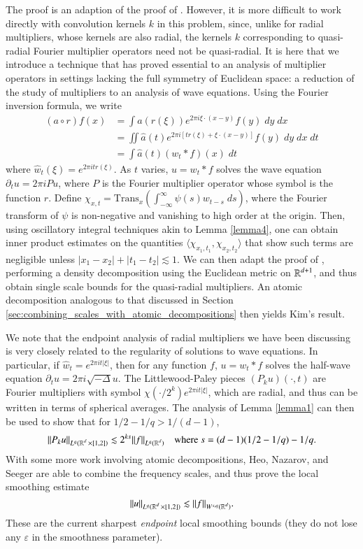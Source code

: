 The proof is an adaption of the proof of \cite{HeoandNazarovandSeeger2}. However, it is more difficult to work directly with convolution kernels $k$ in this problem, since, unlike for radial multipliers, whose kernels are also radial, the kernels $k$ corresponding to quasi-radial Fourier multiplier operators need not be quasi-radial. It is here that we introduce a technique that has proved essential to an analysis of multiplier operators in settings lacking the full symmetry of Euclidean space: a reduction of the study of multipliers to an analysis of wave equations. Using the Fourier inversion formula, we write
%
\begin{align*}
  (a \circ r) f(x) &= \int a(r(\xi)) e^{2 \pi i \xi \cdot (x - y)} f(y)\; dy\; dx\\
  &= \iint \widehat{a}(t) e^{2 \pi i [t r(\xi) + \xi \cdot (x - y)]} f(y)\; dy\; dx\; dt\\
  &= \int \widehat{a}(t) (w_t * f)(x)\; dt
\end{align*}
%
where $\widehat{w}_t(\xi) = e^{2 \pi i t r(\xi)}$. As $t$ varies, $u = w_t * f$ solves the wave equation $\partial_t u = 2 \pi i P u$, where $P$ is the Fourier multiplier operator whose symbol is the function $r$. Define $\chi_{x,t} = \text{Trans}_x \left( \int_{-\infty}^\infty \psi(s) w_{t - s}\; ds \right)$, where the Fourier transform of $\psi$ is non-negative and vanishing to high order at the origin. Then, using oscillatory integral techniques akin to Lemma \ref{lemma4}, one can obtain inner product estimates on the quantities $\langle \chi_{x_1,t_1}, \chi_{x_2,t_2} \rangle$ that show such terms are negligible unless $|x_1 - x_2| + |t_1 - t_2| \lesssim 1$. We can then adapt the proof of \cite{HeoandNazarovandSeeger2}, performing a density decomposition using the Euclidean metric on $\operatorname{\mathbb{R}}^{d+1}$, and thus obtain single scale bounds for the quasi-radial multipliers. An atomic decomposition analogous to that discussed in Section \ref{sec:combining_scales_with_atomic_decompositions} then yields Kim's result.

We note that the endpoint analysis of radial multipliers we have been discussing is very closely related to the regularity of solutions to wave equations. In particular, if $\widehat{w}_t = e^{2 \pi i t |\xi|}$, then for any function $f$, $u = w_t * f$ solves the half-wave equation $\partial_t u = 2 \pi i \sqrt{-\Delta} u$. The Littlewood-Paley pieces $(P_k u)(\cdot,t)$ are Fourier multipliers with symbol $\chi(\cdot / 2^k) e^{2 \pi i t |\xi|}$, which are radial, and thus can be written in terms of spherical averages. The analysis of Lemma \ref{lemma1} can then be used to show that for $1/2 - 1/q > 1/(d-1)$,
%
\[ \| P_k u \|_{L^q( \operatorname{\mathbb{R}}^d \times [1,2] )} \lesssim 2^{k s} \| f \|_{L^q(\operatorname{\mathbb{R}}^d)}\quad\text{where}\ s = (d-1)(1/2 - 1/q) - 1/q. \]
%
With some more work involving atomic decompositions, Heo, Nazarov, and Seeger are able to combine the frequency scales, and thus prove the local smoothing estimate
%
\[ \| u \|_{L^q(\operatorname{\mathbb{R}}^d \times [1,2])} \lesssim \| f \|_{W^{s,q}(\operatorname{\mathbb{R}}^d)}. \]
%
These are the current sharpest \emph{endpoint} local smoothing bounds (they do not lose any $\varepsilon$ in the smoothness parameter).

